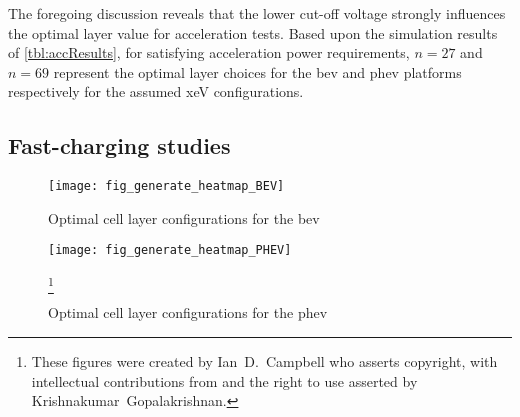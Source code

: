 The foregoing  discussion reveals  that the lower cut-off  voltage strongly
influences  the optimal layer   value  for   acceleration  tests.
Based upon the simulation results of \cref{tbl:accResults},  for satisfying
acceleration power requirements, ${n = 27}$ and ${n=69}$ represent the optimal
layer choices for the \gls{bev} and \gls{phev} platforms respectively for the
assumed \gls{xeV} configurations.

\subsection{Fast-charging studies}\label{sec:fastchgresults}

\begin{figure}[p]
    \begin{minipage}[t]{\textwidth}
        \centering
        \texttt{[image: fig\_generate\_heatmap\_BEV]}
        \captionsetup{labelsep=note}
        \caption[Optimal cell layer configurations for the  for a range of fast charging powers and thermal conditions]{Optimal cell layer configurations for the \gls{bev}}
        \label{fig:fig_generate_heatmap_BEV}
        \setcounter{footnote}{8}
        \vspace*{\floatsep}
        \texttt{[image: fig\_generate\_heatmap\_PHEV]}
        \caption[Optimal cell layer configurations for the  for a range of
        fast charging powers and thermal conditions]{Optimal cell layer configurations for the \gls{phev}}
        \label{fig:fig_generate_heatmap_PHEV}
        \mpfootnotes[1]
        \footnote{These figures were created by \mbox{Ian D.\ Campbell} who asserts copyright,
            with intellectual contributions from and the right to use asserted by
        \mbox{Krishnakumar Gopalakrishnan}.}
    \end{minipage}
\end{figure}

